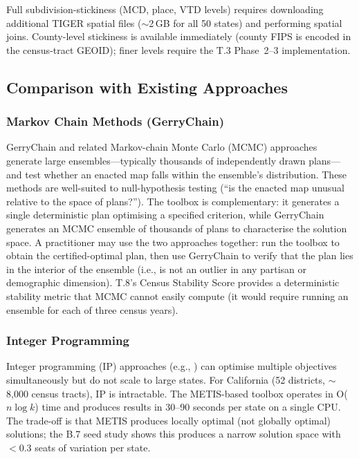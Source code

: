 Full subdivision-stickiness (MCD, place, VTD levels) requires downloading
additional TIGER spatial files ($\sim$2\,GB for all 50 states) and performing
spatial joins.
County-level stickiness is available immediately (county FIPS is encoded in the
census-tract GEOID); finer levels require the T.3 Phase~2--3 implementation.

\subsection{Comparison with Existing Approaches}

\subsubsection*{Markov Chain Methods (GerryChain)}

GerryChain \citep{metric2018} and related Markov-chain Monte Carlo (MCMC) approaches
generate large ensembles---typically thousands of independently drawn plans---and test
whether an enacted map falls within the ensemble's distribution.
These methods are well-suited to null-hypothesis testing (``is the enacted map
unusual relative to the space of plans?'').
The toolbox is complementary: it generates a single deterministic plan optimising
a specified criterion, while GerryChain generates an MCMC ensemble of thousands of
plans to characterise the solution space.
A practitioner may use the two approaches together: run the toolbox to obtain the
certified-optimal plan, then use GerryChain to verify that the plan lies in the
interior of the ensemble (i.e., is not an outlier in any partisan or demographic dimension).
T.8's Census Stability Score provides a deterministic stability metric that
MCMC cannot easily compute (it would require running an ensemble for each of
three census years).

\subsubsection*{Integer Programming}

Integer programming (IP) approaches (e.g., \citet{gurnee2021}) can optimise
multiple objectives simultaneously but do not scale to large states.
For California (52 districts, $\sim$8,000 census tracts), IP is intractable.
The METIS-based toolbox operates in O($n \log k$) time and produces results
in 30--90 seconds per state on a single CPU.
The trade-off is that METIS produces locally optimal (not globally optimal)
solutions; the B.7 seed study shows this produces a narrow solution space
with $< 0.3$ seats of variation per state.


